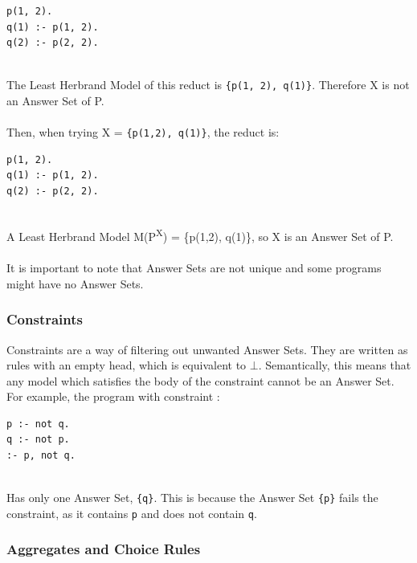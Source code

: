 \begin{lstlisting}
p(1, 2).
q(1) :- p(1, 2).
q(2) :- p(2, 2).
\end{lstlisting}
\mbox{}\\
The Least Herbrand Model of this reduct is \lstinline!{p(1, 2), q(1)}!. Therefore X is not an Answer Set of P. \\ \\
Then, when trying X = \lstinline!{p(1,2), q(1)}!, the reduct is:\\

\begin{lstlisting}
p(1, 2).
q(1) :- p(1, 2).
q(2) :- p(2, 2).
\end{lstlisting}
\mbox{}\\
A Least Herbrand Model M(P\textsuperscript{X}) = \{p(1,2), q(1)\}, so X is an Answer Set of P. \\ \\
It is important to note that Answer Sets are not unique and some programs might have no Answer Sets.

\subsubsection{Constraints}

Constraints \cite{ASPnotes} are a way of filtering out unwanted Answer Sets. They are written as rules with an empty head, which is equivalent to $\bot$. Semantically, this means that any model which satisfies the body of the constraint cannot be an Answer Set. For example, the program with constraint : \\

\begin{lstlisting}
p :- not q.
q :- not p.
:- p, not q.
\end{lstlisting}
\mbox{}\\
Has only one Answer Set, \lstinline!{q}!. This is because the Answer Set \lstinline!{p}! fails the constraint, as it contains \lstinline!p! and does not contain \lstinline!q!.

\subsubsection{Aggregates and Choice Rules}

